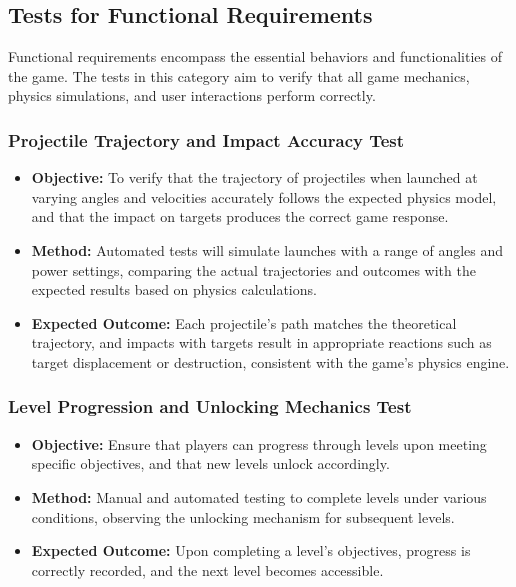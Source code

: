 \documentclass[12pt]{article}
\begin{document}
\subsection{Tests for Functional Requirements}

Functional requirements encompass the essential behaviors and functionalities of the game. The tests in this category aim to verify that all game mechanics, physics simulations, and user interactions perform correctly.

\subsubsection{Projectile Trajectory and Impact Accuracy Test}
\begin{itemize}
    \item \textbf{Objective:} To verify that the trajectory of projectiles when launched at varying angles and velocities accurately follows the expected physics model, and that the impact on targets produces the correct game response.
    \item \textbf{Method:} Automated tests will simulate launches with a range of angles and power settings, comparing the actual trajectories and outcomes with the expected results based on physics calculations.
    \item \textbf{Expected Outcome:} Each projectile's path matches the theoretical trajectory, and impacts with targets result in appropriate reactions such as target displacement or destruction, consistent with the game's physics engine.
\end{itemize}

\subsubsection{Level Progression and Unlocking Mechanics Test}
\begin{itemize}
    \item \textbf{Objective:} Ensure that players can progress through levels upon meeting specific objectives, and that new levels unlock accordingly.
    \item \textbf{Method:} Manual and automated testing to complete levels under various conditions, observing the unlocking mechanism for subsequent levels.
    \item \textbf{Expected Outcome:} Upon completing a level's objectives, progress is correctly recorded, and the next level becomes accessible.
\end{itemize}
\end{document}
